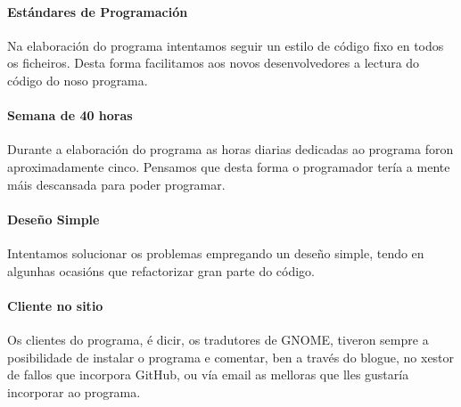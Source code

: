 \paragraph{Estándares de Programación} Na elaboración do programa intentamos seguir un estilo de código fixo en todos os ficheiros. Desta forma facilitamos aos novos desenvolvedores a lectura do código do noso programa.

\paragraph{Semana de 40 horas} Durante a elaboración do programa as horas diarias dedicadas ao programa foron aproximadamente cinco. Pensamos que desta forma o programador tería a mente máis descansada para poder programar.

\paragraph{Deseño Simple} Intentamos solucionar os problemas empregando un deseño simple, tendo en algunhas ocasións que refactorizar gran parte do código.

\paragraph{Cliente no sitio} Os clientes do programa, é dicir, os tradutores de GNOME, tiveron sempre a posibilidade de instalar o programa e comentar, ben a través do blogue, no xestor de fallos que incorpora GitHub, ou vía email as melloras que lles gustaría incorporar ao programa.
